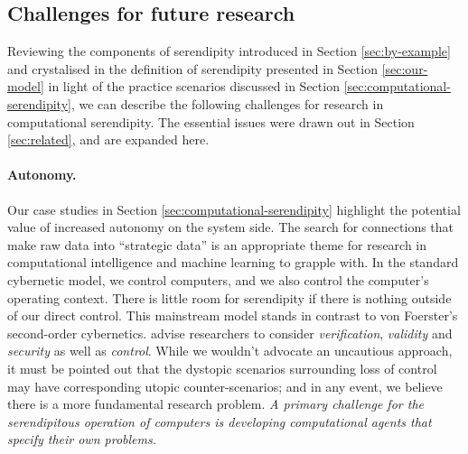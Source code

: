 \subsection{Challenges for future research} \label{sec:recommendations}

 Reviewing the components of serendipity introduced in Section \ref{sec:by-example} and crystalised in the definition of serendipity
presented in Section \ref{sec:our-model} in light of the practice
scenarios discussed in Section \ref{sec:computational-serendipity}, we
can describe the following challenges for research in computational
serendipity.  The essential issues were drawn out in Section \ref{sec:related}, and are expanded here.

\paragraph{\textbf{Autonomy}.} Our case studies in Section
  \ref{sec:computational-serendipity} highlight the potential value of
  increased autonomy on the system side.  The search for connections
  that make raw data into ``strategic data'' is an appropriate theme
  for research in computational intelligence and machine learning to
  grapple with.  In the standard cybernetic model, we control
  computers, and we also control the computer's operating context.
  There is little room for serendipity if there is nothing outside of
  our direct control.  This mainstream model stands in contrast to von
  Foerster's \cite{von2003cybernetics} second-order
  cybernetics.   advise researchers to
  consider \emph{verification}, \emph{validity} and \emph{security} as
  well as \emph{control}.  While we wouldn't advocate an uncautious
  approach, it must be pointed out that the dystopic scenarios
  surrounding loss of control may have corresponding utopic
  counter-scenarios; and in any event, we believe there is a more
  fundamental research problem.  \emph{A primary challenge for
    the serendipitous operation of computers is developing
    computational agents that specify their own problems.}

